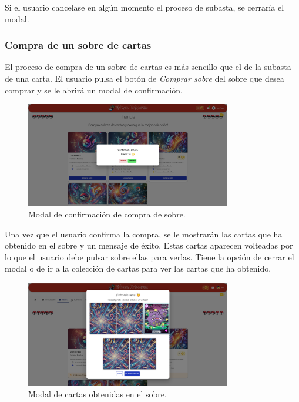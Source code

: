 Si el usuario cancelase en algún momento el proceso de subasta, se cerraría el modal.


\subsubsection{Compra de un sobre de cartas}
El proceso de compra de un sobre de cartas es más sencillo que el de la subasta de una carta.
El usuario pulsa el botón de \textit{Comprar sobre} del sobre que desea comprar y se le abrirá un modal de confirmación.

\begin{figure}[H]
    \centering
    \includegraphics[width=0.8\textwidth]{figures/6-Analisis/6-Interfaz/interfaz/compra_sobre1.png}
    \caption{Modal de confirmación de compra de sobre.}
    \label{fig:interfaz-compra-sobre}
\end{figure}

Una vez que el usuario confirma la compra, se le mostrarán las cartas que ha obtenido en el sobre y un mensaje de éxito.
Estas cartas aparecen volteadas por lo que el usuario debe pulsar sobre ellas para verlas.
Tiene la opción de cerrar el modal o de ir a la colección de cartas para ver las cartas que ha obtenido.

\begin{figure}[H]
    \centering
    \includegraphics[width=0.8\textwidth]{figures/6-Analisis/6-Interfaz/interfaz/compra_sobre.png}
    \caption{Modal de cartas obtenidas en el sobre.}
    \label{fig:interfaz-sobre-comprado}
\end{figure}


